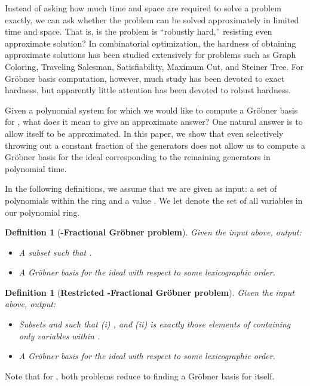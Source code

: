 \documentclass{article}
\newtheorem{defn}[thm]{Definition}
\begin{document}
Instead of asking how much time and space are required to solve a problem exactly, we can ask whether the problem can be solved approximately in limited time and space.  That is, is the problem is ``robustly hard,'' resisting even approximate solution? In combinatorial optimization, the hardness of obtaining approximate solutions has been studied extensively for problems such as Graph Coloring, Traveling Salesman, Satisfiability, Maximum Cut, and Steiner Tree. For Gr\"{o}bner basis computation, however, much study has been devoted to exact hardness, but apparently little attention has been devoted to robust hardness.

Given a polynomial system  for which we would like to compute a Gr\"{o}bner basis for  , what does it mean to give an approximate answer? One natural answer is to allow  itself to be approximated. In this paper, we show that even selectively throwing out a constant fraction of the generators does not allow us to compute a Gr\"{o}bner basis for the ideal corresponding to the remaining generators in polynomial time.


In the following definitions, we assume that we are given as input:  a set of polynomials  within the ring  and a value . We let  denote the set of all variables in our polynomial ring.
\begin{defn}[\textbf{\nobreakdash-Fractional Gr\"obner problem}]
\label{def:fractional}
Given the input above, output:
\begin{itemize}
\item A subset  such that .
\item A Gr\"{o}bner basis for the ideal  with respect to some lexicographic order.
\end{itemize}
\end{defn}

\begin{defn}[\textbf{Restricted \nobreakdash-Fractional Gr\"{o}bner problem}]
\label{def:restricted}
Given the input above, output:
\begin{itemize}
\item Subsets  and  such that (i) , and (ii)  is exactly those elements of  containing only variables within .
\item A Gr\"{o}bner basis for the ideal  with respect to some lexicographic order.
\end{itemize}
\end{defn}

\noindent Note that for , both problems reduce to finding a Gr\"{o}bner basis for  itself.
\end{document}
